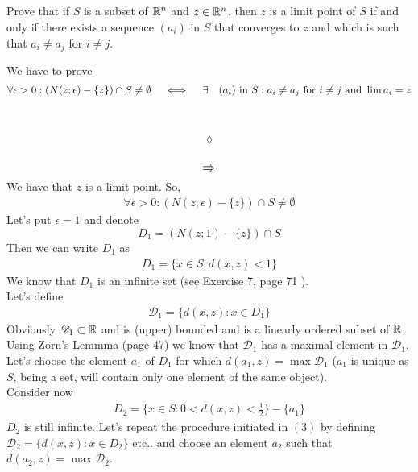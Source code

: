 \subsection{}
\begin{tcolorbox}
Prove that if $S$ is a subset of $\mathbb{R}^n$ and $z \in \mathbb{R}^n$, then $z$ is a limit point of $S$ if and only if there exists a sequence $(a_i)$ in $S$ that converges to $z$ and which is such that $a_i\neq a_j$ for $i\neq j$.
\end{tcolorbox}
We have to prove
$$\forall \epsilon >0: \left(N(z;\epsilon)-\{z\}\right)\cap S\neq\emptyset\quad \iff\quad \exists \quad(a_i)\text{ in } S: a_i\neq a_j \text{ for } i\neq j \text{ and } \lim a_i= z$$\\\\
$$\lozenge$$\\
$$\mathbf{\mathlarger{\implies}}$$
We have that $z$ is a limit point. So, 
\begin{align}
\forall \epsilon >0: \left(N(z;\epsilon)-\{z\}\right)\cap S\neq\emptyset
\end{align}
Let's put $\epsilon =1$ and denote 
$$D_1=\left(N(z;1)-\{z\}\right)\cap S$$
Then we can write $D_1$ as
 \begin{align}
 D_1=\{ x\in S: d(x,z)<1\}
 \end{align}
 We know that $D_1$ is an infinite set (see Exercise 7, page 71 ).\\
 Let's define 
 \begin{align}
 \mathscr{D}_1=\{d(x,z): x\in D_1\}
 \end{align}
 Obviously $\mathscr{D}_1\subset \mathbb{R}$ and is (upper) bounded and is a linearly ordered subset of $\mathbb{R}$. Using Zorn's Lemmma (page 47) we know that $\mathscr{D}_1$ has a maximal element in $\mathscr{D}_1$. Let's choose the element $a_1$ of $D_1$ for which $d(a_1,z)=\max \mathscr{D}_1$ ($a_1$ is unique as $S$, being a set, will contain only one element of the same object).\\
 Consider now 
 \begin{align}
 D_2=\{ x\in S: 0<d(x,z)<\frac{1}{2}\}-\{a_1\}
 \end{align}
 $D_2$ is still infinite. Let's repeat the procedure initiated in $(3)$ by defining $ \mathscr{D}_2=\{d(x,z): x\in D_2\}$ etc.. and choose an element $a_2$ such that $d(a_2,z)=\max \mathscr{D}_2$.\\
